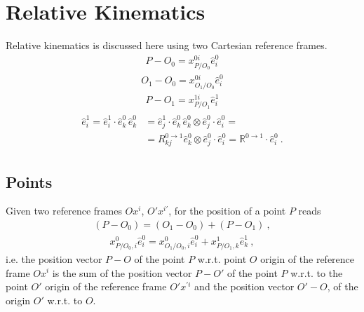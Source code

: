 \documentclass[letterpaper,10pt,english]{jupyterBook}
\begin{document}
\section{Relative Kinematics}
\label{\detokenize{ch/kinematics-relative:relative-kinematics}}\label{\detokenize{ch/kinematics-relative:classical-mechanics-kinematics-relative}}\label{\detokenize{ch/kinematics-relative::doc}}
\sphinxAtStartPar
Relative kinematics is discussed here using two Cartesian reference frames.
\begin{equation*}
\begin{split}P   - O_0 = x^{0i}_{  P/O_0} \hat{e}^0_i\end{split}
\end{equation*}\begin{equation*}
\begin{split}O_1 - O_0 = x^{0i}_{O_1/O_0} \hat{e}^0_i\end{split}
\end{equation*}\begin{equation*}
\begin{split}P   - O_1 = x^{1i}_{  P/O_1} \hat{e}^1_i\end{split}
\end{equation*}\begin{equation*}
\begin{split}\begin{aligned}
  \hat{e}^1_i 
  = \hat{e}^{1}_i \cdot \hat{e}^0_k \, \hat{e}^0_k
  & = \hat{e}^{1}_j \cdot \hat{e}^0_k \, \hat{e}^0_k \otimes \hat{e}^0_j \cdot \hat{e}^0_i = \\
  & = R^{0\rightarrow 1}_{kj} \hat{e}^0_k \otimes \hat{e}^0_j \cdot \hat{e}^0_i 
    = \mathbb{R}^{0\rightarrow 1} \cdot \hat{e}^0_i  \ .
\end{aligned}\end{split}
\end{equation*}

\subsection{Points}
\label{\detokenize{ch/kinematics-relative:points}}
\sphinxAtStartPar
{}
Given two reference frames \(Ox^i\), \(O' x^{i'}\), for the position of a point \(P\) reads
\begin{equation}\label{equation:ch/kinematics-relative:eq:relative:point:pos}
\begin{split}(P - O_0) = ( O_1 - O_0 ) + ( P - O_1) \ ,\end{split}
\end{equation}\begin{equation*}
\begin{split}x^0_{P/O_0,i} \hat{e}^0_i = x^0_{O_1/O_0,i} \hat{e}^0_i + x^1_{P/O_1,k} \hat{e}^1_k \ ,\end{split}
\end{equation*}
\sphinxAtStartPar
i.e. the position vector \(P-O\) of the point \(P\) w.r.t. point \(O\) \sphinxhyphen{} origin of the reference frame \(O x^i\) \sphinxhyphen{} is the sum of the position vector \(P-O'\) of the point \(P\) w.r.t. to the point \(O'\) \sphinxhyphen{} origin of the reference frame \(O' x^{'i}\) \sphinxhyphen{}  and the position vector \(O' - O\), of the origin \(O'\) w.r.t. to \(O\).
\end{document}
